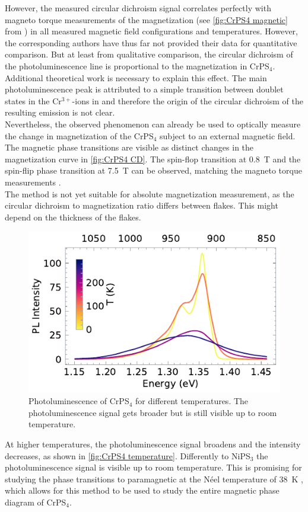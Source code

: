 \documentclass[
	twoside,
	parskip=half,
	a4paper,
]{scrbook}
\begin{document}
However, the measured circular dichroism signal correlates perfectly with magneto torque measurements of the magnetization (see \autoref{fig:CrPS4 magnetic} from \cite{CrPS4_magnetic}) in all measured magnetic field configurations and temperatures.
However, the corresponding authors have thus far not provided their data for quantitative comparison.
But at least from qualitative comparison, the circular dichroism of the photoluminescence line is proportional to the magnetization in CrPS$_4$.\\
Additional theoretical work is necessary to explain this effect.
The main photoluminescence peak is attributed to a simple transition between doublet states in the Cr$^{3+}$-ions in \cite{CrPS4_pl} and therefore the origin of the circular dichroism of the resulting emission is not clear.\\
Nevertheless, the observed phenomenon can already be used to optically measure the change in magnetization of the CrPS$_4$ subject to an external magnetic field.
The magnetic phase transitions are visible as distinct changes in the magnetization curve in \autoref{fig:CrPS4 CD}.
The spin-flop transition at \SI{.8}{T} and the spin-flip phase transition at \SI{7.5}{T} can be observed, matching the magneto torque measurements \cite{CrPS4_magnetic}.\\
The method is not yet suitable for absolute magnetization measurement, as the circular dichroism to magnetization ratio differs between flakes.
This might depend on the thickness of the flakes.


\begin{figure}
	\centering
	\includegraphics{../figures/2024-04-22 CrPS4 temperature series.pdf}
	\caption{Photoluminescence of CrPS$_4$ for different temperatures. The photoluminescence signal gets broader but is still visible up to room temperature.}
	\label{fig:CrPS4 temperature}
\end{figure}
At higher temperatures, the photoluminescence signal broadens and the intensity decreases, as shown in \autoref{fig:CrPS4 temperature}.
Differently to NiPS$_3$ the photoluminescence signal is visible up to room temperature.
This is promising for studying the phase transitions to paramagnetic at the Néel temperature of \SI{38}{K} \cite{CrPS4_magnetic},
which allows for this method to be used to study the entire magnetic phase diagram of CrPS$_4$.
\end{document}
